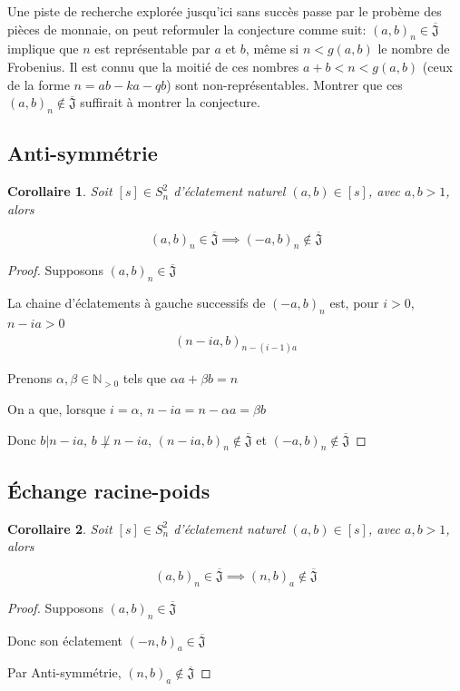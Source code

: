 \documentclass{article}
\newtheorem{corollary}{Corollaire}
\newcommand{\J}{\mathfrak{J}}
\newcommand{\JS}{\overline{\J}}
\begin{document}
Une piste de recherche explorée jusqu'ici sans succès passe par le probème des pièces de monnaie, on peut reformuler la conjecture 
comme suit: ${(a, b)}_n \in \JS$ implique que $n$ est représentable par $a$ et $b$, même si $n < g(a, b)$ le nombre de Frobenius.
Il est connu que la moitié de ces nombres $a + b < n < g(a, b)$ (ceux de la forme $n = ab - ka - qb$) sont non-représentables.
Montrer que ces ${(a, b)}_n \not \in \JS$ suffirait à montrer la conjecture.

\subsection{Anti-symmétrie}

\begin{corollary}
    Soit $[s] \in S_n^2$ d'éclatement naturel $(a, b) \in [s]$, avec $a, b > 1$, alors

    \[ {(a, b)}_n \in \JS \implies {(-a, b)}_n \not \in \JS \]
\end{corollary}

\begin{proof}
    Supposons ${(a, b)}_n \in \JS$

    La chaine d'éclatements à gauche successifs de ${(-a, b)}_n$ est, pour $i > 0$, $n - ia > 0$
    \begin{align*}
        {(n - ia, b)}_{n-(i-1)a}
    \end{align*}

    Prenons $\alpha, \beta \in \mathbb{N}_{>0}$ tels que $\alpha a + \beta b = n$

    On a que, lorsque $i = \alpha$, $n - ia = n - \alpha a = \beta b$

    Donc $b \vert n - ia$, $b \not \perp n - ia$, ${(n - ia, b)}_n \not \in \JS$ et ${(-a, b)}_n \not \in \JS$
\end{proof}

\newpage

\subsection{Échange racine-poids}

\begin{corollary}
    Soit $[s] \in S_n^2$ d'éclatement naturel $(a, b) \in [s]$, avec $a, b > 1$, alors
    
    \[ {(a, b)}_n \in \JS \implies {(n, b)}_a \not \in \JS \]
\end{corollary}

\begin{proof}
    Supposons ${(a, b)}_n \in \JS$

    Donc son éclatement ${(-n, b)}_a \in \JS$

    Par Anti-symmétrie, ${(n, b)}_a \not \in \JS$
\end{proof}
\end{document}
